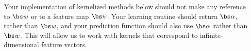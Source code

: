 \documentclass{article}
\newcommand{\nyuparagraph}[1]{\textcolor{nyupurple}{\large #1}}
\theoremstyle{plain}
\theoremstyle{definition}
\begin{document}
Your implementation of kernelized methods below should not make any
reference to $\bs w$ or to a feature map $\bs \psi$. Your learning
routine should return $\bs \alpha$, rather than $\bs w$, and your prediction
function should also use $\bs \alpha$ rather than $\bs w$. This will allow
us to work with kernels that correspond to infinite-dimensional feature
vectors.



\end{document}
